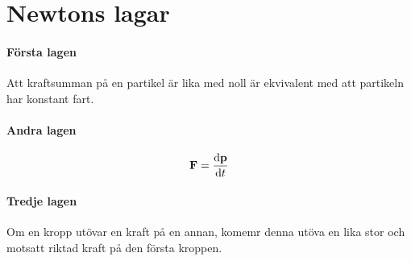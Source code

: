 \section{Newtons lagar}

\paragraph{Första lagen}
Att kraftsumman på en partikel är lika med noll är ekvivalent med att partikeln har konstant fart.

\paragraph{Andra lagen}
\begin{align*}
	\vect{F} = \dv{\vect{p}}{t}
\end{align*}

\paragraph{Tredje lagen}
Om en kropp utövar en kraft på en annan, komemr denna utöva en lika stor och motsatt riktad kraft på den första kroppen.